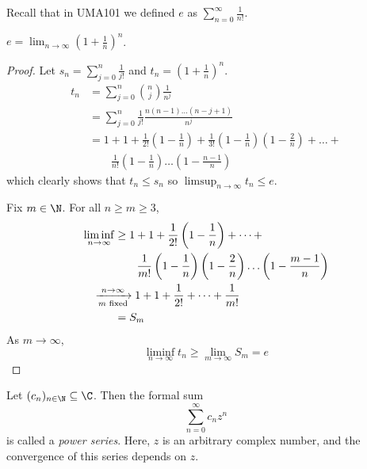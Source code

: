 Recall that in UMA101 we defined $e$ as $\sum_{n=0}^{\infty} \frac1{n!}$.
\begin{theorem}
    $e = \lim_{n \to \infty} \left(1 + \frac1n\right)^n$.
\end{theorem}
\begin{proof}
    Let $s_n = \sum_{j=0}^{n} \frac1{j!}$ and
    $t_n = \left(1 + \frac1n\right)^n$.
    \begin{align*}
        t_n  &= \sum_{j=0}^{n} \binom{n}{j} \frac1{n^j} \\
            &= \sum_{j=0}^{n} \frac1{j!} \frac{n(n-1)\dots(n-j+1)}{n^j} \\
            &= 1 + 1 + \frac1{2!} \left(1 - \frac1n\right)
                + \frac1{3!} \left(1 - \frac1n\right)\left(1 - \frac{2}{n}\right) + \dots + \\
            &\qquad \frac1{n!} \left(1 - \frac1n\right) \ldots \left(1 - \frac{n-1}{n}\right)
    \end{align*}
    which clearly shows that $t_n \le s_n$ so
    $\limsup_{n \to \infty} t_n \le e$.

    Fix $m \in \N$.
    For all $n \ge m \ge 3$, \begin{align*}
        \liminf_{n \to \infty}
            &\ge 1 + 1 + \frac1{2!} \left(1 - \frac1n\right) + \dots + \\
            &\qquad\frac1{m!} \left(1 - \frac1n\right)\left(1 - \frac{2}{n}\right)\dots \left(1-\frac{m-1}{n}\right)\\
            &\hspace{-2em}\xrightarrow[m \text{ fixed}]{n \to \infty} 1 + 1 + \frac1{2!} + \dots + \frac1{m!} \\
            &= S_m
    \end{align*}
    As $m \to \infty$, \[
        \liminf_{n \to \infty} t_n \ge \lim_{m \to \infty} S_m = e
    \]
\end{proof}

\begin{definition*} \label{def:fps}
    Let $(c_n)_{n \in \N} \subseteq \C$.
    Then the formal sum \[
        \sum_{n=0}^{\infty} c_n z^n
    \] is called a \emph{power series}.
    Here, $z$ is an arbitrary complex number, and the convergence of this
    series depends on $z$.
\end{definition*}
